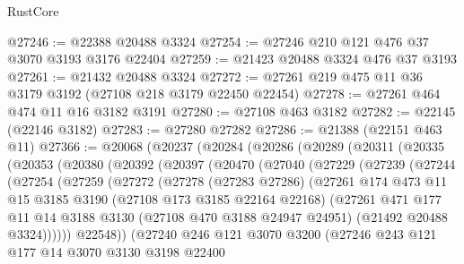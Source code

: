 \begin{lexlean}{RustCore}
\begin{coremodule}
@27246 := @22388 @20488 @3324
@27254 := @27246 @210 @121 @476 @37 @3070 @3193 @3176 @22404
@27259 := @21423 @20488 @3324 @476 @37 @3193
@27261 := @21432 @20488 @3324
@27272 := @27261 @219 @475 @11 @36 @3179 @3192 (@27108 @218 @3179 @22450 @22454)
@27278 := @27261 @464 @474 @11 @16 @3182 @3191
@27280 := @27108 @463 @3182
@27282 := @22145 (@22146 @3182)
@27283 := @27280 @27282
@27286 := @21388 (@22151 @463 @11)
@27366 := @20068
    (@20237
      (@20284
        (@20286
          (@20289
            (@20311
              (@20335
                (@20353
                  (@20380
                    (@20392
                      (@20397
                        (@20470
                          (@27040
                            (@27229
                              (@27239
                                (@27244
                                  (@27254
                                    (@27259
                                      (@27272
                                        (@27278
                                          (@27283 @27286)
                                          (@27261
                                            @174
                                            @473
                                            @11
                                            @15
                                            @3185
                                            @3190
                                            (@27108 @173 @3185 @22164 @22168)
                                            (@27261
                                              @471
                                              @177
                                              @11
                                              @14
                                              @3188
                                              @3130
                                              (@27108 @470 @3188 @24947 @24951)
                                              (@21492 @20488 @3324))))))
                                    @22548))
                                (@27240
                                  @246
                                  @121
                                  @3070
                                  @3200
                                  (@27246
                                    @243
                                    @121
                                    @177
                                    @14
                                    @3070
                                    @3130
                                    @3198
                                    @22400

\end{coremodule}
\end{lexlean}
